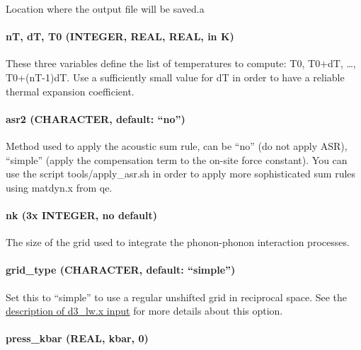 \documentclass[
]{article}
\begin{document}
Location where the output file will be saved.a

\hypertarget{nt-dt-t0-integer-real-real-in-k}{%
\paragraph{nT, dT, T0 (INTEGER, REAL, REAL, in
K)}\label{nt-dt-t0-integer-real-real-in-k}}

These three variables define the list of temperatures to compute: T0,
T0+dT, \ldots, T0+(nT-1)dT. Use a sufficiently small value for dT in
order to have a reliable thermal expansion coefficient.

\hypertarget{asr2-character-default-no-1}{%
\paragraph{\texorpdfstring{asr2 (CHARACTER, default:
\enquote{no})}{asr2 (CHARACTER, default: ``no'')}}\label{asr2-character-default-no-1}}

Method used to apply the acoustic sum rule, can be \enquote{no} (do not
apply ASR), \enquote{simple} (apply the compensation term to the on-site
force constant). You can use the script tools/apply\_asr.sh in order to
apply more sophisticated sum rules using matdyn.x from qe.

\hypertarget{nk-3x-integer-no-default}{%
\paragraph{nk (3x INTEGER, no default)}\label{nk-3x-integer-no-default}}

The size of the grid used to integrate the phonon-phonon interaction
processes.

\hypertarget{grid_type-character-default-simple}{%
\paragraph{\texorpdfstring{grid\_type (CHARACTER, default:
\enquote{simple})}{grid\_type (CHARACTER, default: ``simple'')}}\label{grid_type-character-default-simple}}

Set this to \enquote{simple} to use a regular unshifted grid in
reciprocal space. See the
\protect\hyperlink{grid_type-character-default-simple-1}{description of
d3\_lw.x input} for more details about this option.

\hypertarget{press_kbar-real-kbar-0}{%
\paragraph{press\_kbar (REAL, kbar, 0)}\label{press_kbar-real-kbar-0}}
\end{document}
